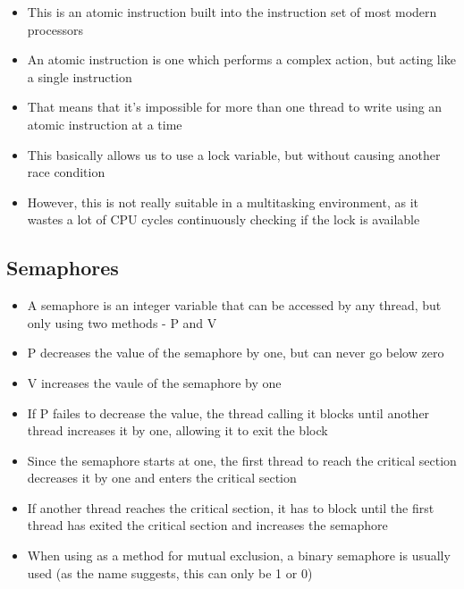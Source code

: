 \begin{itemize}
  \item This is an atomic instruction built into the instruction set of most modern processors
  \item An atomic instruction is one which performs a complex action, but acting like a single instruction
  \item That means that it's impossible for more than one thread to write using an atomic instruction at a time
  \item This basically allows us to use a lock variable, but without causing another race condition
  \item However, this is not really suitable in a multitasking environment, as it wastes a lot of CPU cycles continuously checking if the lock is available
\end{itemize}

\subsection*{Semaphores}

\begin{itemize}
  \item A semaphore is an integer variable that can be accessed by any thread, but only using two methods - P and V
  \item P decreases the value of the semaphore by one, but can never go below zero
  \item V increases the vaule of the semaphore by one
  \item If P failes to decrease the value, the thread calling it blocks until another thread increases it by one, allowing it to exit the block
  \item Since the semaphore starts at one, the first thread to reach the critical section decreases it by one and enters the critical section
  \item If another thread reaches the critical section, it has to block until the first thread has exited the critical section and increases the semaphore
  \item When using as a method for mutual exclusion, a binary semaphore is usually used (as the name suggests, this can only be 1 or 0)
\end{itemize}